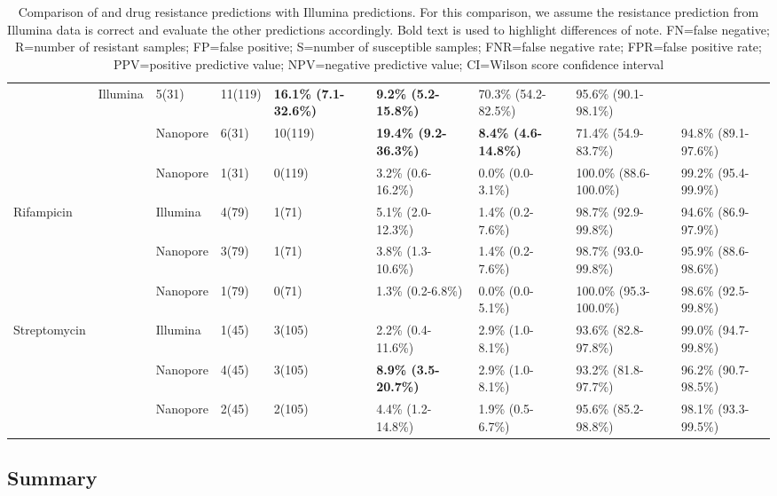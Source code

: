 \begin{table}
{\begin{tabular}{lllllllll}
  \drprg{} &
  Illumina &
  5(31) &
  11(119) &
  \textbf{16.1\% (7.1-32.6\%)} &
  \textbf{9.2\% (5.2-15.8\%)} &
  70.3\% (54.2-82.5\%) &
  95.6\% (90.1-98.1\%) \\
 &
  \drprg{} &
  Nanopore &
  6(31) &
  10(119) &
  \textbf{19.4\% (9.2-36.3\%)} &
  \textbf{8.4\% (4.6-14.8\%)} &
  71.4\% (54.9-83.7\%) &
  94.8\% (89.1-97.6\%) \\
 &
  \mykrobe{} &
  Nanopore &
  1(31) &
  0(119) &
  3.2\% (0.6-16.2\%) &
  0.0\% (0.0-3.1\%) &
  100.0\% (88.6-100.0\%) &
  99.2\% (95.4-99.9\%) \\ \cline{2-9} 
\multirow{3}{*}{Rifampicin} &
  \drprg{} &
  Illumina &
  4(79) &
  1(71) &
  5.1\% (2.0-12.3\%) &
  1.4\% (0.2-7.6\%) &
  98.7\% (92.9-99.8\%) &
  94.6\% (86.9-97.9\%) \\
 &
  \drprg{} &
  Nanopore &
  3(79) &
  1(71) &
  3.8\% (1.3-10.6\%) &
  1.4\% (0.2-7.6\%) &
  98.7\% (93.0-99.8\%) &
  95.9\% (88.6-98.6\%) \\
 &
  \mykrobe{} &
  Nanopore &
  1(79) &
  0(71) &
  1.3\% (0.2-6.8\%) &
  0.0\% (0.0-5.1\%) &
  100.0\% (95.3-100.0\%) &
  98.6\% (92.5-99.8\%) \\ \cline{2-9} 
\multirow{3}{*}{Streptomycin} &
  \drprg{} &
  Illumina &
  1(45) &
  3(105) &
  2.2\% (0.4-11.6\%) &
  2.9\% (1.0-8.1\%) &
  93.6\% (82.8-97.8\%) &
  99.0\% (94.7-99.8\%) \\
 &
  \drprg{} &
  Nanopore &
  4(45) &
  3(105) &
  \textbf{8.9\% (3.5-20.7\%)} &
  2.9\% (1.0-8.1\%) &
  93.2\% (81.8-97.7\%) &
  96.2\% (90.7-98.5\%) \\
 &
  \mykrobe{} &
  Nanopore &
  2(45) &
  2(105) &
  4.4\% (1.2-14.8\%) &
  1.9\% (0.5-6.7\%) &
  95.6\% (85.2-98.8\%) &
  98.1\% (93.3-99.5\%) \\ \cline{2-9} 
\end{tabular}%
}
\caption{Comparison of \drprg{} and \mykrobe{} \ont{} drug resistance predictions with \mykrobe{} Illumina predictions. For this comparison, we assume the \mykrobe{} resistance prediction from Illumina data is correct and evaluate the other predictions accordingly. Bold text is used to highlight differences of note. FN=false negative; R=number of resistant samples; FP=false positive; S=number of susceptible samples; FNR=false negative rate; FPR=false positive rate; PPV=positive predictive value; NPV=negative predictive value; CI=Wilson score confidence interval}
\label{tab:geno-concordance}
\end{table}

\subsection{Summary}

